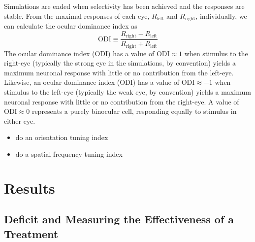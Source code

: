 \documentclass[
  letterpaper,
  DIV=11,
  numbers=noendperiod]{scrreprt}
\providecommand{\tightlist}{%
  \setlength{\itemsep}{0pt}\setlength{\parskip}{0pt}}\usepackage{longtable,booktabs,array}
\begin{document}
Simulations are ended when selectivity has been achieved and the
responses are stable. From the maximal responses of each eye,
\(R_{\text{left}}\) and \(R_{\text{right}}\), individually, we can
calculate the ocular dominance index as \[
\text{ODI} \equiv \frac{R_{\text{right}}-R_{\text{left}}}{R_{\text{right}}+R_{\text{left}}}
\] The ocular dominance index (ODI) has a value of
\(\text{ODI} \approx 1\) when stimulus to the right-eye (typically the
strong eye in the simulations, by convention) yields a maximum neuronal
response with little or no contribution from the left-eye. Likewise, an
ocular dominance index (ODI) has a value of \(\text{ODI} \approx -1\)
when stimulus to the left-eye (typically the weak eye, by convention)
yields a maximum neuronal response with little or no contribution from
the right-eye. A value of \(\text{ODI} \approx 0\) represents a purely
binocular cell, responding equally to stimulus in either eye.

\begin{tcolorbox}[enhanced jigsaw, rightrule=.15mm, colbacktitle=quarto-callout-important-color!10!white, bottomrule=.15mm, coltitle=black, breakable, titlerule=0mm, left=2mm, colframe=quarto-callout-important-color-frame, toptitle=1mm, arc=.35mm, colback=white, title=\textcolor{quarto-callout-important-color}{\faExclamation}\hspace{0.5em}{Important}, bottomtitle=1mm, leftrule=.75mm, opacityback=0, toprule=.15mm, opacitybacktitle=0.6]

\begin{itemize}
\tightlist
\item
  do an orientation tuning index
\item
  do a spatial frequency tuning index
\end{itemize}

\end{tcolorbox}

\part{Results}

\hypertarget{deficit-and-measuring-the-effectiveness-of-a-treatment}{%
\chapter{Deficit and Measuring the Effectiveness of a
Treatment}\label{deficit-and-measuring-the-effectiveness-of-a-treatment}}
\end{document}

